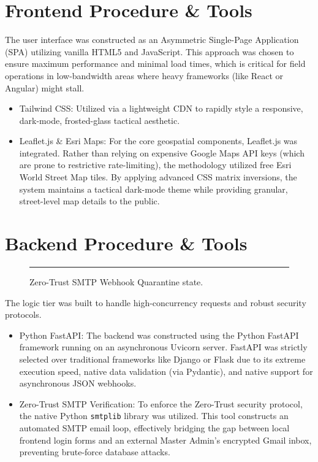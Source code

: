 \documentclass[12pt,a4paper]{report}
\begin{document}
\section{Frontend Procedure \& Tools}
The user interface was constructed as an Asymmetric Single-Page Application (SPA) utilizing vanilla HTML5 and JavaScript. This approach was chosen to ensure maximum performance and minimal load times, which is critical for field operations in low-bandwidth areas where heavy frameworks (like React or Angular) might stall.
\begin{itemize}
    \item Tailwind CSS: Utilized via a lightweight CDN to rapidly style a responsive, dark-mode, frosted-glass tactical aesthetic.
    \item Leaflet.js \& Esri Maps: For the core geospatial components, Leaflet.js was integrated. Rather than relying on expensive Google Maps API keys (which are prone to restrictive rate-limiting), the methodology utilized free Esri World Street Map tiles. By applying advanced CSS matrix inversions, the system maintains a tactical dark-mode theme while providing granular, street-level map details to the public.
\end{itemize}

\section{Backend Procedure \& Tools}

\begin{figure}[H]
    \centering
    \rule{10cm}{6cm} %
    \caption{Zero-Trust SMTP Webhook Quarantine state.}
\end{figure}

The logic tier was built to handle high-concurrency requests and robust security protocols.
\begin{itemize}
    \item Python FastAPI: The backend was constructed using the Python FastAPI framework running on an asynchronous Uvicorn server. FastAPI was strictly selected over traditional frameworks like Django or Flask due to its extreme execution speed, native data validation (via Pydantic), and native support for asynchronous JSON webhooks.
    \item Zero-Trust SMTP Verification: To enforce the Zero-Trust security protocol, the native Python \texttt{smtplib} library was utilized. This tool constructs an automated SMTP email loop, effectively bridging the gap between local frontend login forms and an external Master Admin's encrypted Gmail inbox, preventing brute-force database attacks.
\end{itemize}
\end{document}
